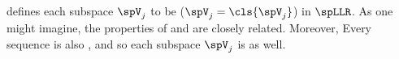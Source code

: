 defines each subspace $\spV_j$ to be  ($\spV_j=\cls{\spV_j}$) in $\spLLR$.
As one might imagine, the properties of and
are closely related. %
Moreover, Every  sequence is also ,
and so each subspace $\spV_j$ is  as well. %




